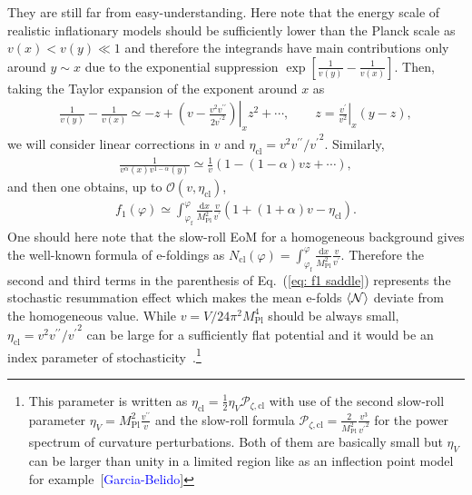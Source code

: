 \documentclass[aps, prd
, preprint
, nofootinbib 
, superscriptaddress
, longbibliography
]{revtex4-1}
\newcommand{\dd}{\mathrm{d}}
\newcommand{\Mpl}{M_\text{Pl}}
\newcommand{\cl}{\text{cl}}
\newcommand{\uf}{\text{f}}
\newcommand{\calN}{\mathcal{N}}
\newcommand{\calO}{\mathcal{O}}
\newcommand{\calP}{\mathcal{P}}
\newcommand{\bae}[1]{\begin{align} #1 \end{align}}
\newcommand{\Blue}[1]{\textcolor{blue}{\sffamily #1}}
\begin{document}
They are still far from easy-understanding.
Here note that the energy scale of realistic inflationary models should be sufficiently lower than the Planck scale as $v(x)<v(y)\ll1$ and therefore the integrands have main contributions only around $y\sim x$ due to the exponential suppression $\exp\left[\frac{1}{v(y)}-\frac{1}{v(x)}\right]$.
Then, taking the Taylor expansion of the exponent around $x$ as
\bae{
	\frac{1}{v(y)}-\frac{1}{v(x)}\simeq-z+\left.\left(v-\frac{v^2v^{\prime\prime}}{2{v^\prime}^2}\right)\right|_xz^2+\cdots, \qquad z=\left.\frac{v^\prime}{v^2}\right|_x(y-z),
}
we will consider linear corrections in $v$ and $\eta_\cl=v^2v^{\prime\prime}/{v^\prime}^2$.
Similarly,
\bae{
	\frac{1}{v^\alpha(x)v^{1-\alpha}(y)}\simeq\frac{1}{v}\left(1-(1-\alpha)vz+\cdots\right),
}
and then one obtains, up to $\calO(v,\eta_\cl)$,
\bae{\label{eq: f1 saddle}
	f_1(\varphi)\simeq\int^\varphi_{\varphi_\uf}\frac{\dd x}{\Mpl^2}\frac{v}{v^\prime}\left(1+(1+\alpha)v-\eta_\cl\right).
}
One should here note that the slow-roll EoM for a homogeneous background gives the well-known formula of e-foldings as $N_\cl(\varphi)=\int^\varphi_{\varphi_\uf}\frac{\dd x}{\Mpl^2}\frac{v}{v^\prime}$.
Therefore the second and third terms in the parenthesis of Eq.~(\ref{eq: f1 saddle}) represents the stochastic resummation effect which makes the mean e-folds $\braket{\calN}$ deviate from the homogeneous value.
While $v=V/24\pi^2\Mpl^4$ should be always small, $\eta_\cl=v^2v^{\prime\prime}/{v^\prime}^2$ can be large for a sufficiently flat potential and it would be an index parameter of stochasticity~\cite{Vennin:2015hra}.\footnote{This parameter is written as $\eta_\cl=\frac{1}{2}\eta_V\calP_{\zeta,\cl}$ with use of the second slow-roll parameter $\eta_V=\Mpl^2\frac{v^{\prime\prime}}{v}$ and the slow-roll formula $\calP_{\zeta,\cl}=\frac{2}{\Mpl^2}\frac{v^3}{{v^\prime}^2}$ for the power spectrum of curvature perturbations. Both of them are basically small but $\eta_V$ can be larger than unity in a limited region like as an inflection point model for example~[\Blue{Garcia-Belido}]}
\end{document}
